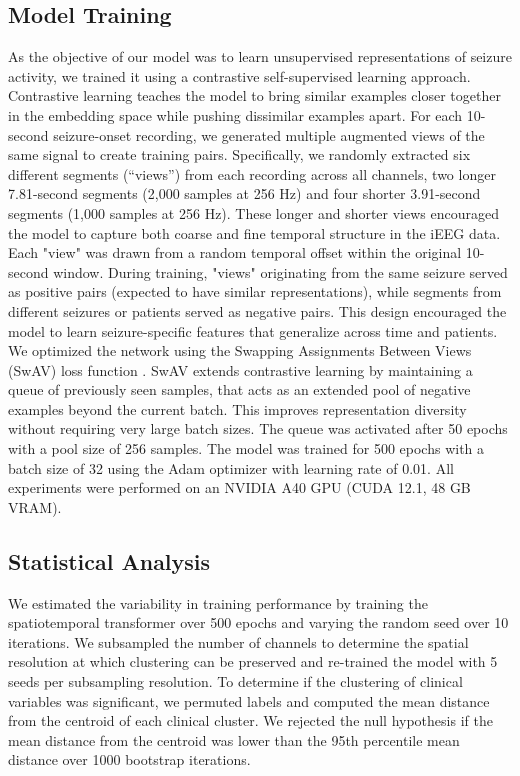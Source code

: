 \documentclass[11pt]{article}
\begin{document}
\subsection*{Model Training}
As the objective of our model was to learn unsupervised representations of seizure activity, we trained it using a contrastive self-supervised learning approach. Contrastive learning teaches the model to bring similar examples closer together in the embedding space while pushing dissimilar examples apart. For each 10-second seizure-onset recording, we generated multiple augmented views of the same signal to create training pairs. Specifically, we randomly extracted six different segments (“views”) from each recording across all channels, two longer 7.81-second segments (2,000 samples at 256 Hz) and four shorter 3.91-second segments (1,000 samples at 256 Hz). These longer and shorter views encouraged the model to capture both coarse and fine temporal structure in the iEEG data. Each "view" was drawn from a random temporal offset within the original 10-second window. During training, "views" originating from the same seizure served as positive pairs (expected to have similar representations), while segments from different seizures or patients served as negative pairs. This design encouraged the model to learn seizure-specific features that generalize across time and patients. We optimized the network using the Swapping Assignments Between Views (SwAV) loss function \cite{Caron2020Unsupervised}. SwAV extends contrastive learning by maintaining a queue of previously seen samples, that acts as an extended pool of negative examples beyond the current batch. This improves representation diversity without requiring very large batch sizes. The queue was activated after 50 epochs with a pool size of 256 samples. The model was trained for 500 epochs with a batch size of 32 using the Adam optimizer with learning rate of 0.01. All experiments were performed on an NVIDIA A40 GPU (CUDA 12.1, 48 GB VRAM). 

\subsection*{Statistical Analysis}
We estimated the variability in training performance by training the spatiotemporal transformer over 500 epochs and varying the random seed over 10 iterations. We subsampled the number of channels to determine the spatial resolution at which clustering can be preserved and re-trained the model with 5 seeds per subsampling resolution. To determine if the clustering of clinical variables was significant, we permuted labels and computed the mean distance from the centroid of each clinical cluster. We rejected the null hypothesis if the mean distance from the centroid was lower than the 95th percentile mean distance over 1000 bootstrap iterations.
\end{document}
